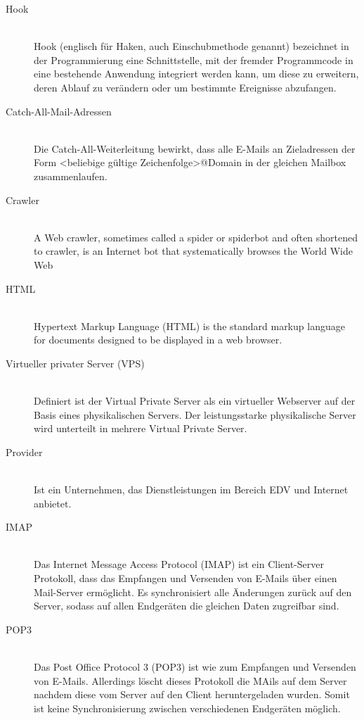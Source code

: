 \documentclass[a4paper,11pt,singlespacing]{article}
\begin{document}
\begin{description}
	\item[Hook\label{itm:Hook}]\hfill \\
		Hook (englisch für Haken, auch Einschubmethode genannt) bezeichnet in der Programmierung eine Schnittstelle, mit der fremder Programmcode in eine bestehende Anwendung integriert werden kann, um diese zu erweitern, deren Ablauf zu verändern oder um bestimmte Ereignisse abzufangen.\cite{Hook}
	\item[Catch-All-Mail-Adressen\label{itm:Catch-All-Mail}]\hfill \\
		Die Catch-All-Weiterleitung bewirkt, dass alle E-Mails an Zieladressen der Form <beliebige gültige Zeichenfolge>@Domain in der gleichen Mailbox zusammenlaufen.\cite{Catch-All-Mail}
	\item[Crawler\label{itm:crawler}]\hfill \\
		A Web crawler, sometimes called a spider or spiderbot and often shortened to crawler, is an Internet bot that systematically browses the World Wide Web \cite{crawler}
	\item[HTML\label{itm:HTML}]\hfill \\
		Hypertext Markup Language (HTML) is the standard markup language for documents designed to be displayed in a web browser.\cite{HTML}
	\item[Virtueller privater Server (VPS)\label{itm:VPS}]\hfill \\
        	Definiert ist der Virtual Private Server als ein virtueller Webserver auf der Basis eines physikalischen Servers.
		Der leistungsstarke physikalische Server wird unterteilt in mehrere Virtual Private Server.\cite{VPS}
	\item[Provider\label{itm:Provider}]\hfill \\
		Ist ein Unternehmen, das Dienstleistungen im Bereich EDV und Internet anbietet. \cite{provider}
	\item[IMAP\label{itm:IMAP}]\hfill \\
		Das Internet Message Access Protocol (IMAP) ist ein Client-Server Protokoll, dass das Empfangen und Versenden von E-Mails über einen Mail-Server ermöglicht. Es synchronisiert alle Änderungen zurück auf den Server, sodass auf allen Endgeräten die gleichen Daten zugreifbar sind. \cite{imap}
	\item[POP3\label{itm:POP3}]\hfill \\
		Das Post Office Protocol 3 (POP3) ist wie  zum  Empfangen und Versenden von E-Mails. Allerdings löscht dieses Protokoll die MAils auf dem Server nachdem diese vom Server auf den Client heruntergeladen wurden. Somit ist keine Synchronisierung zwischen verschiedenen Endgeräten möglich.\cite{pop3}

\end{description}
\end{document}
